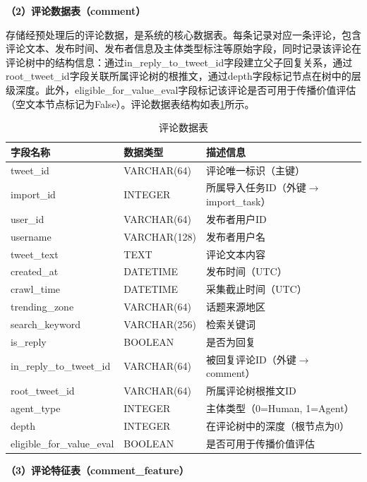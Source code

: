 \textbf{（2）评论数据表（comment）}

存储经预处理后的评论数据，是系统的核心数据表。每条记录对应一条评论，包含评论文本、发布时间、发布者信息及主体类型标注等原始字段，同时记录该评论在评论树中的结构信息：通过in\_reply\_to\_tweet\_id字段建立父子回复关系，通过root\_tweet\_id字段关联所属评论树的根推文，通过depth字段标记节点在树中的层级深度。此外，eligible\_for\_value\_eval字段标记该评论是否可用于传播价值评估（空文本节点标记为False）。评论数据表结构如表\ref{tab:comment}所示。

\begin{table}[H]
  \centering
  \caption{评论数据表}
  \label{tab:comment}
  \renewcommand\arraystretch{1.35}
  \begin{tabular}{>{\centering\arraybackslash}m{4cm} >{\centering\arraybackslash}m{2.5cm} >{\centering\arraybackslash}m{7cm}}
    \toprule
    字段名称 & 数据类型 & 描述信息 \\
    \midrule
    tweet\_id & VARCHAR(64) & 评论唯一标识（主键） \\
    import\_id & INTEGER & 所属导入任务ID（外键$\to$import\_task） \\
    user\_id & VARCHAR(64) & 发布者用户ID \\
    username & VARCHAR(128) & 发布者用户名 \\
    tweet\_text & TEXT & 评论文本内容 \\
    created\_at & DATETIME & 发布时间（UTC） \\
    crawl\_time & DATETIME & 采集截止时间（UTC） \\
    trending\_zone & VARCHAR(64) & 话题来源地区 \\
    search\_keyword & VARCHAR(256) & 检索关键词 \\
    is\_reply & BOOLEAN & 是否为回复 \\
    in\_reply\_to\_tweet\_id & VARCHAR(64) & 被回复评论ID（外键$\to$comment） \\
    root\_tweet\_id & VARCHAR(64) & 所属评论树根推文ID \\
    agent\_type & INTEGER & 主体类型（0=Human, 1=Agent） \\
    depth & INTEGER & 在评论树中的深度（根节点为0） \\
    eligible\_for\_value\_eval & BOOLEAN & 是否可用于传播价值评估 \\
    \bottomrule
  \end{tabular}
\end{table}

\textbf{（3）评论特征表（comment\_feature）}

